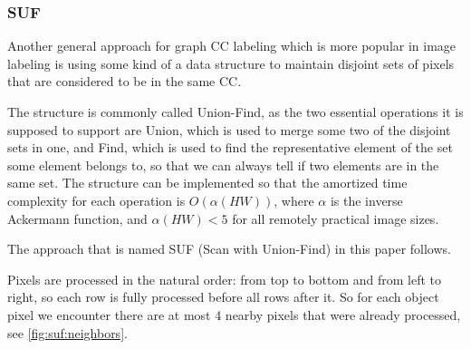 \documentclass[hidelinks]{llncs}
\newcommand{\texten}[1]{#1}
\newcommand{\textru}[1]{}
\begin{document}
\subsubsection{SUF}

\texten{
Another general approach for graph CC labeling which is more popular in image
labeling is using some kind of a data structure to maintain disjoint sets of pixels
that are considered to be in the same CC.
}\textru{
Другой, более популярный в этом контексте общий подход к подсчёту компонент
связности состоит в том, чтобы использовать структуру данных для поддержания
набора непересекающихся множеств пикселей, чем, по сути, КС и являются.
}

\texten{
The structure is commonly called Union-Find, as the two essential operations
it is supposed to support are Union, which is used to merge some two of the
disjoint sets in one, and Find, which is used to find the representative element
of the set some element belongs to, so that we can always tell if two elements are
in the same set.
The structure can be implemented so that the amortized time complexity for each
operation is $O(\alpha(HW))$, where $\alpha$ is the inverse Ackermann function,
and $\alpha(HW) < 5$ for all remotely practical image sizes\cite{CLRS}. %
}\textru{
Эту структуру принято называть Union-Find, так как две основные операции,
которые она поддерживает, это Union~--- объединение двух множеств в одно, и
Find~--- нахождение характерного представителя для множества, содержащего данный
элемент.
Этот представитель может быть использован для проверки принадлежности двух
элементов одному и тому же множеству.
Эта структура данных хорошо изучена и может быть реализована так, что
амортизированная сложность каждой операции~--- всего $O(\alpha(HW))$, где
$\alpha$~--- обратная функция Аккермана.
Для всех практически возможных размеров изображения эта функция не превосходит 5.
}

\texten{
The approach that is named SUF (Scan with Union-Find) in this paper follows.
}\textru{
Далее следует описание подхода, который мы называем SUF (Scan with Union-Find).
}

\texten{
Pixels are processed in the natural order: from top to bottom and from
left to right, so each row is fully processed before all rows after it.
So for each object pixel we encounter there are at most 4 nearby pixels
that were already processed, see \autoref{fig:suf:neighbors}.
}\textru{
Пиксели обрабатываются в естественном порядке сверху вниз слева направо, так что
каждая строка начинает обрабатываться, когда все предыдущие строки уже
обработаны. Таким образом, у очередного пикселя может быть до четырёх пикселей,
которые находятся рядом и уже были обработаны.
}
\end{document}
